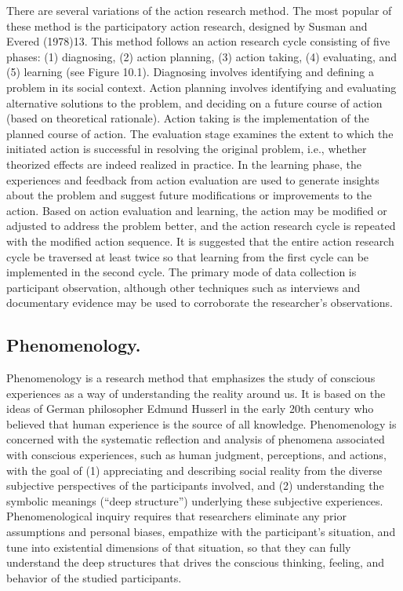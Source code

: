 There are several variations of the action research method. The most popular of these method is the participatory action research, designed by Susman and Evered (1978)13. This method follows an action research cycle consisting of five phases: (1) diagnosing, (2) action planning, (3) action taking, (4) evaluating, and (5) learning (see Figure 10.1). Diagnosing involves identifying and defining a problem in its social context. Action planning involves identifying and evaluating alternative solutions to the problem, and deciding on a future course of action (based on theoretical rationale). Action taking is the implementation of the planned course of action. The evaluation stage examines the extent to which the initiated action is successful in resolving the original problem, i.e., whether theorized effects are indeed realized in practice. In the learning phase, the experiences and feedback from action evaluation are used to generate insights about the problem and suggest future modifications or improvements to the action. Based on action evaluation and learning, the action may be modified or adjusted to address the problem better, and the action research cycle is repeated with the modified action sequence. It is suggested that the entire action research cycle be traversed at least twice so that learning from the first cycle can be implemented in the second cycle. The primary mode of data collection is participant observation, although other techniques such as interviews and documentary evidence may be used to corroborate the researcher's observations.


\subsection{Phenomenology.} Phenomenology is a research method that emphasizes the study of conscious experiences as a way of understanding the reality around us. It is based on the ideas of German philosopher Edmund Husserl in the early 20th century who believed that human experience is the source of all knowledge. Phenomenology is concerned with the systematic reflection and analysis of phenomena associated with conscious experiences, such as human judgment, perceptions, and actions, with the goal of (1) appreciating and describing social reality from the diverse subjective perspectives of the participants involved, and (2) understanding the symbolic meanings (``deep structure'') underlying these subjective experiences. Phenomenological inquiry requires that researchers eliminate any prior assumptions and personal biases, empathize with the participant's situation, and tune into existential dimensions of that situation, so that they can fully understand the deep structures that drives the conscious thinking, feeling, and behavior of the studied participants.

